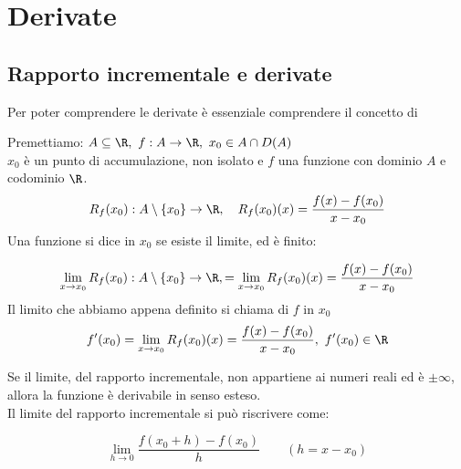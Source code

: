 \documentclass[../analisi.tex]{subfiles}
\begin{document}
\section{Derivate}%
\label{sec:derivate}

\subsection{Rapporto incrementale e derivate}%
\label{sub:rapporto_incrementale_e_derivate}
Per poter  comprendere le derivate è essenziale comprendere il concetto di 
\\

\begin{defn}
Premettiamo: $ \acr,\ f: A \to \R,\ x_0 \in A \cap D(A)$\\
$ x_0$ è un punto di accumulazione, non isolato e $f$ una funzione con dominio
$A$ e codominio $\R$.\\

\begin{equation}
	R_f ( x_0 ): A \setminus \{ x_0 \} \to \R, \quad 
	R_f ( x_0 ) (x) = \frac{f(x) - f(x_0) }{x - x_0} 
\end{equation}
Una funzione si dice  in $x_0$ se esiste il limite, ed è finito:

\begin{equation}
	\limxo R_f ( x_0 ): A \setminus \{ x_0 \} \to \R, =
	\limxo R_f ( x_0 ) (x) = \frac{f(x) - f(x_0) }{x - x_0} 
\end{equation}
Il limito che abbiamo appena definito si chiama  di $f$ in $x_0$
\begin{equation}
	f'( x_0 ) =
	\limxo R_f ( x_0 ) (x) = \frac{f(x) - f(x_0) }{x - x_0},\
	f'(x_0) \in \R
\end{equation}
\end{defn} 
Se il limite, del rapporto incrementale, non appartiene ai numeri reali ed è 
$\pm \infty$, allora la funzione è derivabile in senso esteso.\\
Il limite del rapporto incrementale si può riscrivere come:

\begin{equation}
	\lim_{h \to 0} \frac{f(x_0 + h ) - f(x_0) }{h} \qquad (h = x - x_0)
\end{equation}
\end{document}
